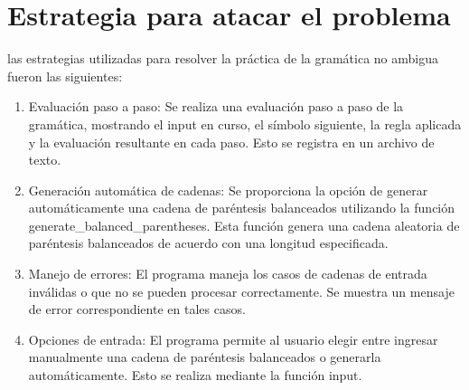 \section{Estrategia para atacar el problema}
 las estrategias utilizadas para resolver la práctica de la gramática no ambigua fueron las siguientes:\newline
\begin{enumerate}
    \item Evaluación paso a paso: Se realiza una evaluación paso a paso de la gramática, mostrando el input en curso, el símbolo siguiente, la regla aplicada y la evaluación resultante en cada paso. Esto se registra en un archivo de texto.\newline

    \item Generación automática de cadenas: Se proporciona la opción de generar automáticamente una cadena de paréntesis balanceados utilizando la función generate\_balanced\_parentheses. Esta función genera una cadena aleatoria de paréntesis balanceados de acuerdo con una longitud especificada.\newline
    
    \item Manejo de errores: El programa maneja los casos de cadenas de entrada inválidas o que no se pueden procesar correctamente. Se muestra un mensaje de error correspondiente en tales casos.\newline
    
    \item Opciones de entrada: El programa permite al usuario elegir entre ingresar manualmente una cadena de paréntesis balanceados o generarla automáticamente. Esto se realiza mediante la función input.\newline
\end{enumerate}



